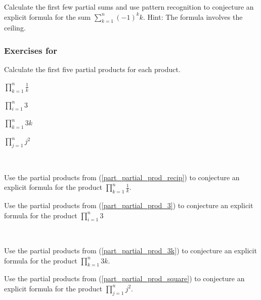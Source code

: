 \begin{exer}[\exerE] %
\label{exer_sum_conj_alt_sum}
    Calculate the first few partial sums and use pattern recognition to conjecture an explicit formula for the sum $\displaystyle \sum_{k=1}^n(-1)^kk$.  Hint: The formula involves the ceiling.
\end{exer}


\subsubsection*{Exercises for  \subprodconj}

\begin{exer}[\exerP] %
\label{exer_partial_prod}
    Calculate the first five partial products for each product.
        \begin{exerpart}
            \item \label{part_partial_prod_recip} $\displaystyle \prod_{k=1}^n\frac{1}{k}$
            \item \label{part_partial_prod_3} $\displaystyle  \prod_{i=1}^n3$
            \item \label{part_partial_prod_3k} $\displaystyle \prod_{k=1}^n3k$
            \item \label{part_partial_prod_square} $\displaystyle \prod_{j=1}^nj^2$
        \end{exerpart}    
\end{exer}

\begin{exer}[\exerP] %
\label{exer_prod_conj_recip_constant}
~
    \begin{exerpart}
        \item Use the partial products from  (\ref{part_partial_prod_recip}) to conjecture an explicit formula for the product $\displaystyle \prod_{k=1}^n\frac{1}{k}$. %
        \item Use the partial products from  (\ref{part_partial_prod_3}) to conjecture an explicit formula for the product $\displaystyle \prod_{i=1}^n3$ %
    \end{exerpart}
\end{exer}

\begin{exer}[\exerU] %
\label{exer_prod_conj_3k_square}
~
    \begin{exerpart}
        \item Use the partial products from  (\ref{part_partial_prod_3k}) to conjecture an explicit formula for the product $\displaystyle \prod_{k=1}^n3k$. %
        \item Use the partial products from  (\ref{part_partial_prod_square}) to conjecture an explicit formula for the product $\displaystyle \prod_{j=1}^nj^2$. %
    \end{exerpart}
\end{exer}

